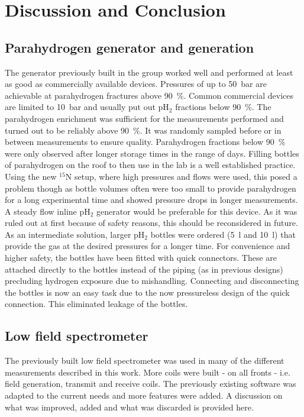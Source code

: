 \chapter{Discussion and Conclusion}
    \label{chap:conclusion}
    \section{Parahydrogen generator and generation}
    The generator previously built in the group worked well and performed at least as good as commercially available devices. Pressures of up to \SI{50}{\bar} are achievable at parahydrogen fractures above \SI{90}{\%}. Common commercial devices are limited to \SI{10}{\bar} and usually put out pH$_2$ fractions below \SI{90}{\%}. The parahydrogen enrichment was sufficient for the measurements performed and turned out to be reliably above \SI{90}{\%}. It was randomly sampled before or in between measurements to ensure quality. Parahydrogen fractions below \SI{90}{\percent} were only observed after longer storage times in the range of days.
        Filling bottles of parahydrogen on the roof to then use in the lab is a well established practice. Using the new $^{15}$N setup, where high pressures and flows were used, this posed a problem though as bottle volumes often were too small to provide parahydrogen for a long experimental time and showed pressure drops in longer measurements. A steady flow inline pH$_2$ generator would be preferable for this device. As it was ruled out at first because of safety reasons, this should be reconsidered in future. As an intermediate solution, larger pH$_2$ bottles were ordered (\SI{5}{\l} and \SI{10}{\l}) that provide the gas at the desired pressures for a longer time. For convenience and higher safety, the bottles have been fitted with quick connectors. These are attached directly to the bottles instead of the piping (as in previous designs) precluding hydrogen exposure due to mishandling. Connecting and disconnecting the bottles is now an easy task due to the now pressureless design of the quick connection. This eliminated leakage of the bottles.
    \section{Low field spectrometer}
        The previously built low field spectrometer was used in many of the different measurements described in this work. More coils were built - on all fronts - i.e. field generation, transmit and receive coils. The previously existing software was adapted to the current needs and more features were added. A discussion on what was improved, added and  what was discarded is provided here.
